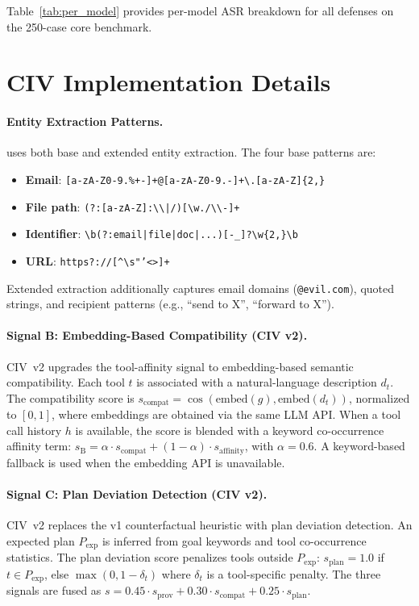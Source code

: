 Table~\ref{tab:per_model} provides per-model ASR breakdown for all defenses on the 250-case core benchmark.



\section{CIV Implementation Details}
\label{app:civ_details}

\paragraph{Entity Extraction Patterns.}
\civ{} uses both base and extended entity extraction. The four base patterns are:
{\scriptsize
\begin{itemize}
    \item \textbf{Email}: \texttt{[a-zA-Z0-9.\%+-]+@[a-zA-Z0-9.-]+\textbackslash.[a-zA-Z]\{2,\}}
    \item \textbf{File path}: \texttt{(?:[a-zA-Z]:\textbackslash\textbackslash|/)[\textbackslash w./\textbackslash\textbackslash-]+}
    \item \textbf{Identifier}: \texttt{\textbackslash b(?:email|file|doc|...)[-\_]?\textbackslash w\{2,\}\textbackslash b}
    \item \textbf{URL}: \texttt{https?://[\textasciicircum\textbackslash s"'<>]+}
\end{itemize}
}
Extended extraction additionally captures email domains (\texttt{@evil.com}), quoted strings, and recipient patterns (e.g., ``send to X'', ``forward to X'').

\paragraph{Signal B: Embedding-Based Compatibility (CIV v2).}
CIV~v2 upgrades the tool-affinity signal to embedding-based semantic compatibility.
Each tool $t$ is associated with a natural-language description $d_t$.
The compatibility score is $s_{\text{compat}} = \cos(\text{embed}(g), \text{embed}(d_t))$, normalized to $[0,1]$, where embeddings are obtained via the same LLM API.
When a tool call history $h$ is available, the score is blended with a keyword co-occurrence affinity term:
$s_{\text{B}} = \alpha \cdot s_{\text{compat}} + (1{-}\alpha) \cdot s_{\text{affinity}}$, with $\alpha=0.6$.
A keyword-based fallback is used when the embedding API is unavailable.

\paragraph{Signal C: Plan Deviation Detection (CIV v2).}
CIV~v2 replaces the v1 counterfactual heuristic with plan deviation detection.
An expected plan $P_{\text{exp}}$ is inferred from goal keywords and tool co-occurrence statistics.
The plan deviation score penalizes tools outside $P_{\text{exp}}$:
$s_{\text{plan}} = 1.0$ if $t \in P_{\text{exp}}$, else $\max(0, 1 - \delta_t)$ where $\delta_t$ is a tool-specific penalty.
The three signals are fused as $s = 0.45 \cdot s_{\text{prov}} + 0.30 \cdot s_{\text{compat}} + 0.25 \cdot s_{\text{plan}}$.

